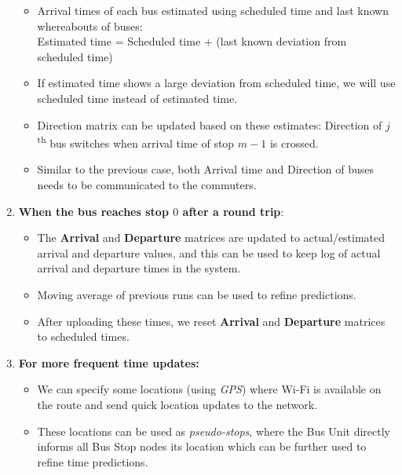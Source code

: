 \begin{enumerate}
\begin{itemize}
\item Arrival times of each bus estimated using scheduled time and last known whereabouts of buses:\\
Estimated time = Scheduled time + (last known deviation from scheduled 
time)
\item If estimated time shows a large deviation from scheduled time, we will use scheduled time instead of estimated time.
\item Direction matrix can be updated based on these estimates: Direction of $j$\textsuperscript{th} bus switches when arrival time of stop $m-1$ is crossed.
\item Similar to the previous case, both Arrival time and Direction of buses needs to be communicated to the commuters.
\end{itemize}
\item \textbf{When the bus reaches stop $0$ after a round trip}:
\begin{itemize}
\item  The \textbf{Arrival} and \textbf{Departure} matrices are updated to actual/estimated arrival and departure values, and this can be used to keep log of actual arrival and departure times in the system.
\item Moving average of previous runs can be used to refine predictions.
\item  After uploading these times, we reset \textbf{Arrival} and \textbf{Departure} matrices to scheduled times.
\end{itemize}
\item \textbf{For more frequent time updates:}
\begin{itemize}
\item We can specify some locations (using \textit{GPS}) where Wi-Fi is available on the route and send quick location updates to the network.
\item These locations can be used as \textit{pseudo-stops}, where the Bus Unit directly informs all Bus Stop nodes its location which can be further used to refine time predictions.
\end{itemize}
\end{enumerate}